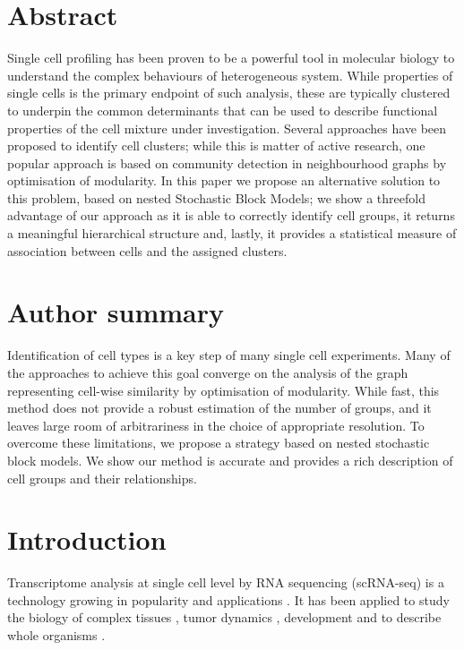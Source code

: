\documentclass[10pt,letterpaper]{article}
\begin{document}
\section*{Abstract}
Single cell profiling has been proven to be a powerful tool in molecular biology to understand the complex behaviours of heterogeneous system. While properties of single cells is the primary endpoint of such analysis, these are typically clustered to underpin the common determinants that can be used to describe functional properties of the cell mixture under investigation. Several approaches have been proposed to identify cell clusters; while this is matter of active research, one popular approach is based on community detection in neighbourhood graphs by optimisation of modularity. In this paper we propose an alternative solution to this problem, based on nested Stochastic Block Models; we show a threefold advantage of our approach as it is able to correctly identify cell groups, it returns a meaningful hierarchical structure and, lastly, it provides a statistical measure of association between cells and the assigned clusters.


\section*{Author summary}
Identification of cell types is a key step of many single cell experiments. Many of the approaches to achieve this goal converge on the analysis of the graph representing cell-wise similarity by optimisation of modularity. While fast, this method does not provide a robust estimation of the number of groups, and it leaves large room of arbitrariness in the choice of appropriate resolution. To overcome these limitations, we propose a strategy based on nested stochastic block models. We show our method is accurate and provides a rich description of cell groups and their relationships.

\linenumbers

\section*{Introduction}
Transcriptome analysis at single cell level by RNA sequencing (scRNA-seq) is a technology growing in popularity and applications \cite{svensson_2018}. It has been applied to study the biology of complex tissues \cite{guo_2018, ventotormo_2018}, tumor dynamics \cite{rozenblattrosen_2020, tirosh_2016, patel_2014, neftel_2019}, development \cite{rosenberg_2018, wagner_2018} and to describe whole organisms \cite{plass_2018, regev_2017}.
\end{document}

